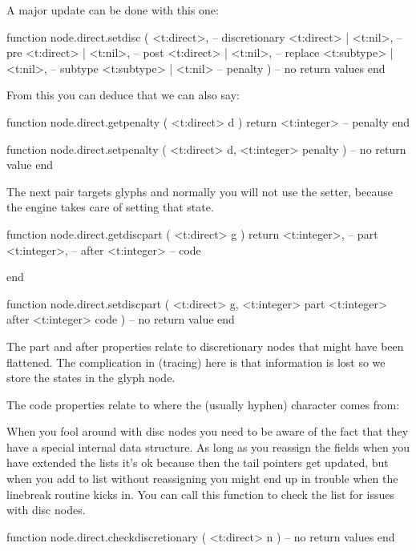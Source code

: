 A major update can be done with this one:

\starttyping[option=LUA]
function node.direct.setdisc (
    <t:direct>,            -- discretionary
    <t:direct>  | <t:nil>, -- pre
    <t:direct>  | <t:nil>, -- post
    <t:direct>  | <t:nil>, -- replace
    <t:subtype> | <t:nil>, -- subtype
    <t:subtype> | <t:nil>  -- penalty
)
    -- no return values
end
\stoptyping

From this you can deduce that we can also say:

\starttyping[option=LUA]
function node.direct.getpenalty ( <t:direct> d )
    return <t:integer> -- penalty
end

function node.direct.setpenalty ( <t:direct> d, <t:integer> penalty )
    -- no return value
end
\stoptyping

The next pair targets glyphs and normally you will not use the setter, because
the engine takes care of setting that state.

\starttyping[option=LUA]
function node.direct.getdiscpart ( <t:direct> g )
    return
        <t:integer>, -- part
        <t:integer>, -- after
        <t:integer>  -- code

end

function node.direct.setdiscpart (
    <t:direct>  g,
    <t:integer> part
    <t:integer> after
    <t:integer> code
)
    -- no return value
end
\stoptyping

The part and after properties relate to discretionary nodes that might have been
flattened. The complication in (tracing) here is that information is lost so we
store the states in the glyph node.


The code properties relate to where the (usually hyphen) character comes from:


When you fool around with disc nodes you need to be aware of the fact that they
have a special internal data structure. As long as you reassign the fields when
you have extended the lists it's ok because then the tail pointers get updated,
but when you add to list without reassigning you might end up in trouble when
the linebreak routine kicks in. You can call this function to check the list for
issues with disc nodes.

\starttyping[option=LUA]
function node.direct.checkdiscretionary ( <t:direct> n )
    -- no return values
end
\stoptyping

